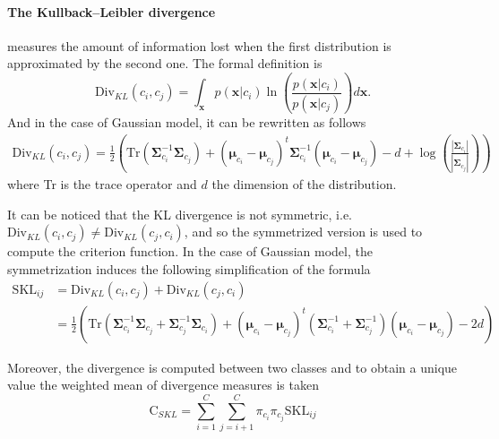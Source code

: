 \documentclass[a4paper,11pt,DIV=16]{scrartcl}
\begin{document}
        \paragraph{The Kullback–Leibler divergence} measures the amount of information lost when the first distribution is approximated by the second one. The formal definition is
        \begin{equation}
            \text{Div}_{KL}(c_i,c_j) = \int_\mathbf{x} p(\mathbf{x}|c_i) \ln(\frac{p(\mathbf{x}|c_i)}{p(\mathbf{x}|c_j)}) d\mathbf{x}.
        \end{equation}
        And in the case of Gaussian model, it can be rewritten as follows
        \begin{align}
            \text{Div}_{KL}(c_i,c_j) = \frac{1}{2} \left( \text{Tr} (\boldsymbol{\Sigma}_{c_i}^{-1} \boldsymbol{\Sigma}_{c_j}) + (\boldsymbol{\mu}_{c_i} - \boldsymbol{\mu}_{c_j})^t \boldsymbol{\Sigma}_{c_i}^{-1} (\boldsymbol{\mu}_{c_i} - \boldsymbol{\mu}_{c_j}) - d + \log \left( \frac{|\boldsymbol{\Sigma}_{c_i}|}{|\boldsymbol{\Sigma}_{c_j}|} \right) \right)
        \end{align}
        where Tr is the trace operator and $d$ the dimension of the distribution.

        It can be noticed that the KL divergence is not symmetric, i.e. $\text{Div}_{KL}(c_i,c_j) \ne \text{Div}_{KL}(c_j,c_i)$, and so the symmetrized version is used to compute the criterion function. In the case of Gaussian model, the symmetrization induces the following simplification of the formula
        \begin{align}
            \text{SKL}_{ij} &=\text{Div}_{KL}(c_i,c_j) + \text{Div}_{KL}(c_j,c_i) \nonumber \\
            &= \frac{1}{2} \left( \text{Tr} (\boldsymbol{\Sigma}_{c_i}^{-1} \boldsymbol{\Sigma}_{c_j} + \boldsymbol{\Sigma}_{c_j}^{-1} \boldsymbol{\Sigma}_{c_i}) + (\boldsymbol{\mu}_{c_i} - \boldsymbol{\mu}_{c_j})^t (\boldsymbol{\Sigma}_{c_i}^{-1} + \boldsymbol{\Sigma}_{c_j}^{-1}) (\boldsymbol{\mu}_{c_i} - \boldsymbol{\mu}_{c_j}) - 2d \right)
        \end{align}

        Moreover, the divergence is computed between two classes and to obtain a unique value the weighted mean of divergence measures is taken
        \begin{equation}
            \text{C}_{SKL} = \sum_{i=1}^{C} \sum_{j=i + 1}^{C} \pi_{c_i} \pi_{c_j} \text{SKL}_{ij}
        \end{equation}
\end{document}

